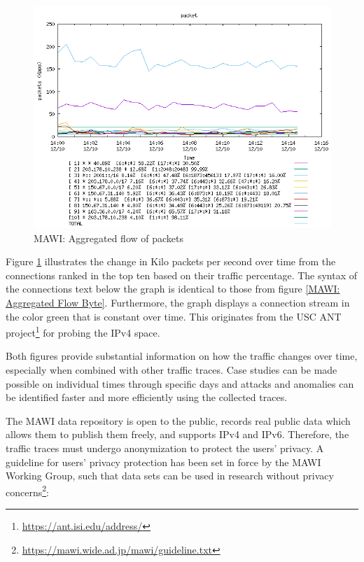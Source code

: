 \documentclass[sigconf,authorversion,nonacm]{acmart}
\begin{document}
\begin{figure}
        \centering
        \includegraphics[width=1\linewidth]{MAWI/MAWI 2023-12-10 aggregated analysis packet.png}
        \caption{MAWI: Aggregated flow of packets}
        \label{MAWI: Aggregated Flow Packet}
\end{figure}

Figure \ref{MAWI: Aggregated Flow Packet} illustrates the change in Kilo packets per second over time from the connections ranked in the top ten based on their traffic percentage. The syntax of the connections text below the graph is identical to those from figure \ref{MAWI: Aggregated Flow Byte}. Furthermore, the graph displays a connection stream in the color green that is constant over time. This originates from the USC ANT project\footnote{\url{https://ant.isi.edu/address/}} for probing the IPv4 space.

Both figures provide substantial information on how the traffic changes over time, especially when combined with other traffic traces. Case studies can be made possible on individual times through specific days and attacks and anomalies can be identified faster and more efficiently using the collected traces.

The MAWI data repository is open to the public, records real public data which allows them to publish them freely, and supports IPv4 and IPv6. Therefore, the traffic traces must undergo anonymization to protect the users' privacy. A guideline for users' privacy protection has been set in force by the MAWI Working Group, such that data sets can be used in research without privacy concerns\footnote{\url{https://mawi.wide.ad.jp/mawi/guideline.txt}}:
\end{document}
